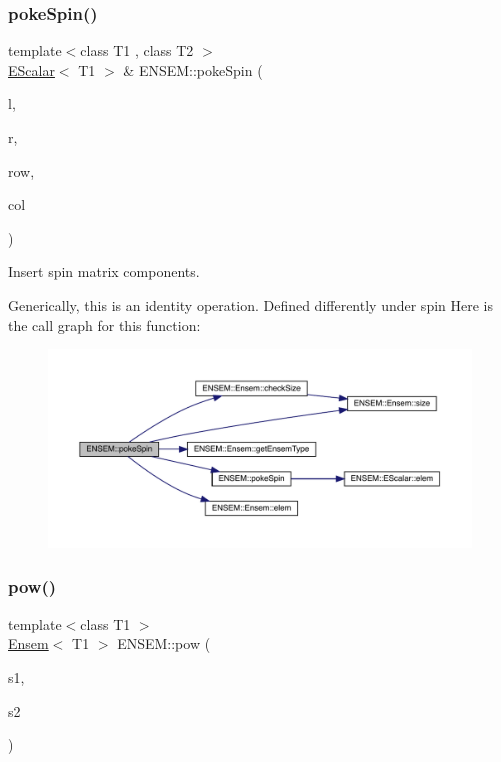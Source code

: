 \subsubsection{\texorpdfstring{pokeSpin()}{pokeSpin()}\hspace{0.1cm}{\footnotesize\ttfamily [2/2]}}
{\footnotesize\ttfamily template$<$class T1 , class T2 $>$ \\
\mbox{\hyperlink{classENSEM_1_1EScalar}{E\+Scalar}}$<$ T1 $>$ \& E\+N\+S\+E\+M\+::poke\+Spin (\begin{DoxyParamCaption}\item[{\mbox{\hyperlink{classENSEM_1_1Ensem}{Ensem}}$<$ T1 $>$ \&}]{l,  }\item[{const \mbox{\hyperlink{classENSEM_1_1Ensem}{Ensem}}$<$ T2 $>$ \&}]{r,  }\item[{int}]{row,  }\item[{int}]{col }\end{DoxyParamCaption})\hspace{0.3cm}{\ttfamily [inline]}}



Insert spin matrix components. 

Generically, this is an identity operation. Defined differently under spin Here is the call graph for this function\+:\nopagebreak
\begin{figure}[H]
\begin{center}
\leavevmode
\includegraphics[width=350pt]{d1/d9e/group__eensem_ga21cbf6a127bd98e6cf1909afe3050089_cgraph}
\end{center}
\end{figure}
\mbox{\label{group__eensem_ga038873ee1f1a6dfb9540558711f11110}} 
\subsubsection{\texorpdfstring{pow()}{pow()}\hspace{0.1cm}{\footnotesize\ttfamily [1/4]}}
{\footnotesize\ttfamily template$<$class T1 $>$ \\
\mbox{\hyperlink{classENSEM_1_1Ensem}{Ensem}}$<$ T1 $>$ E\+N\+S\+E\+M\+::pow (\begin{DoxyParamCaption}\item[{const \mbox{\hyperlink{classENSEM_1_1Ensem}{Ensem}}$<$ T1 $>$ \&}]{s1,  }\item[{int}]{s2 }\end{DoxyParamCaption})\hspace{0.3cm}{\ttfamily [inline]}}



